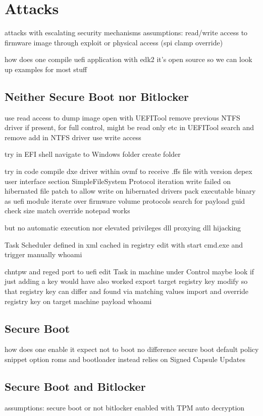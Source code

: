 
\chapter{Attacks}

attacks with escalating security mechanisms
assumptions:
read/write access to firmware image through
exploit or physical access (spi clamp override)

how does one compile uefi application with edk2
it's open source so we can look up examples for most stuff


\section{Neither Secure Boot nor Bitlocker}
use read access to dump image
open with UEFITool
remove previous NTFS driver if present, for full control, might be read only etc
in UEFITool search and remove
add in NTFS driver
use write access

try in EFI shell
navigate to Windows folder
create folder

try in code
compile dxe driver within ovmf to receive .ffs file with version depex user interface section
SimpleFileSystem Protocol iteration
write failed on hibernated file
patch to allow write on hibernated drivers
pack executable binary as uefi module
iterate over firmware volume protocols
search for payload guid
check size match
override notepad works

but no automatic execution nor elevated privileges
dll proxying
dll hijacking

Task Scheduler
defined in xml
cached in registry
edit with start cmd.exe and trigger manually
whoami

chntpw and reged
port to uefi
edit Task in machine under Control
maybe look if just adding a key would have also worked
export target registry key
modify so that registry key can differ and found via matching values
import and override registry key on target machine
payload whoami


\section{Secure Boot}
how does one enable it
expect not to boot
no difference
secure boot default policy snippet
option roms and bootloader
instead relies on Signed Capsule Updates


\section{Secure Boot and Bitlocker}
assumptions:
secure boot or not
bitlocker enabled with TPM auto decryption

